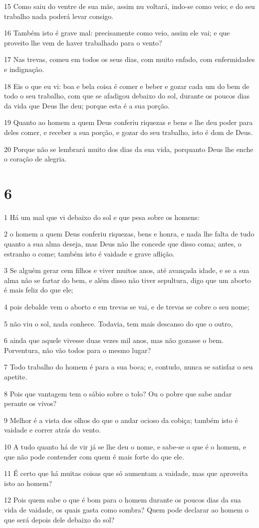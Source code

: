 \par 15 Como saiu do ventre de sua mãe, assim nu voltará, indo-se como veio; e do seu trabalho nada poderá levar consigo.
\par 16 Também isto é grave mal: precisamente como veio, assim ele vai; e que proveito lhe vem de haver trabalhado para o vento?
\par 17 Nas trevas, comeu em todos os seus dias, com muito enfado, com enfermidades e indignação.
\par 18 Eis o que eu vi: boa e bela coisa é comer e beber e gozar cada um do bem de todo o seu trabalho, com que se afadigou debaixo do sol, durante os poucos dias da vida que Deus lhe deu; porque esta é a sua porção.
\par 19 Quanto ao homem a quem Deus conferiu riquezas e bens e lhe deu poder para deles comer, e receber a sua porção, e gozar do seu trabalho, isto é dom de Deus.
\par 20 Porque não se lembrará muito dos dias da sua vida, porquanto Deus lhe enche o coração de alegria.

\chapter{6}

\par 1 Há um mal que vi debaixo do sol e que pesa sobre os homens:
\par 2 o homem a quem Deus conferiu riquezas, bens e honra, e nada lhe falta de tudo quanto a sua alma deseja, mas Deus não lhe concede que disso coma; antes, o estranho o come; também isto é vaidade e grave aflição.
\par 3 Se alguém gerar cem filhos e viver muitos anos, até avançada idade, e se a sua alma não se fartar do bem, e além disso não tiver sepultura, digo que um aborto é mais feliz do que ele;
\par 4 pois debalde vem o aborto e em trevas se vai, e de trevas se cobre o seu nome;
\par 5 não viu o sol, nada conhece. Todavia, tem mais descanso do que o outro,
\par 6 ainda que aquele vivesse duas vezes mil anos, mas não gozasse o bem. Porventura, não vão todos para o mesmo lugar?
\par 7 Todo trabalho do homem é para a sua boca; e, contudo, nunca se satisfaz o seu apetite.
\par 8 Pois que vantagem tem o sábio sobre o tolo? Ou o pobre que sabe andar perante os vivos?
\par 9 Melhor é a vista dos olhos do que o andar ocioso da cobiça; também isto é vaidade e correr atrás do vento.
\par 10 A tudo quanto há de vir já se lhe deu o nome, e sabe-se o que é o homem, e que não pode contender com quem é mais forte do que ele.
\par 11 É certo que há muitas coisas que só aumentam a vaidade, mas que aproveita isto ao homem?
\par 12 Pois quem sabe o que é bom para o homem durante os poucos dias da sua vida de vaidade, os quais gasta como sombra? Quem pode declarar ao homem o que será depois dele debaixo do sol?

